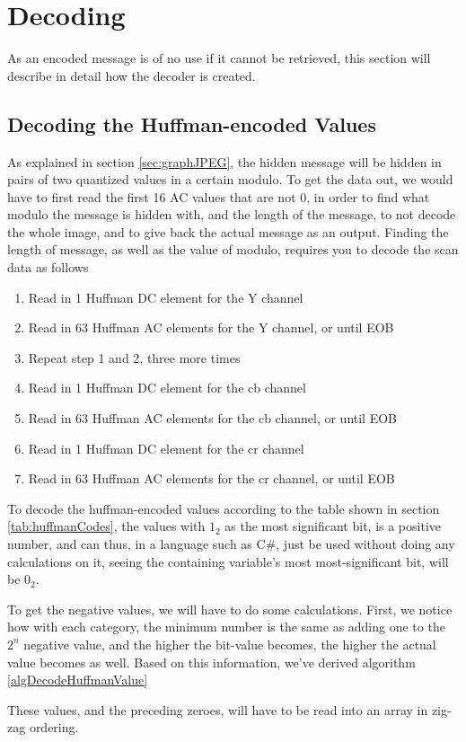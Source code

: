 \section{Decoding}
As an encoded message is of no use if it cannot be retrieved, this section will describe in detail how the decoder is created.



\subsection{Decoding the Huffman-encoded Values}
As explained in section \ref{sec:graphJPEG}, the hidden message will be hidden in pairs of two quantized values in a certain modulo.
To get the data out, we would have to first read the first 16 AC values that are not 0, in order to find what modulo the message is hidden with, and the length of the message, to not decode the whole image, and to give back the actual message as an output.
Finding the length of message, as well as the value of modulo, requires you to decode the scan data as follows
\begin{enumerate}
	\item Read in 1 Huffman DC element for the Y channel
	\item Read in 63 Huffman AC elements for the Y channel, or until EOB
	\item Repeat step 1 and 2, three more times
	\item Read in 1 Huffman DC element for the cb channel
	\item Read in 63 Huffman AC elements for the cb channel, or until EOB
	\item Read in 1 Huffman DC element for the cr channel
	\item Read in 63 Huffman AC elements for the cr channel, or until EOB
\end{enumerate}
To decode the huffman-encoded values according to the table shown in section \ref{tab:huffmanCodes}, the values with $1_2$ as the most significant bit, is a positive number, and can thus, in a language such as C\#, just be used without doing any calculations on it, seeing the containing variable's most most-significant bit, will be $0_2$.

To get the negative values, we will have to do some calculations. 
First, we notice how with each category, the minimum number is the same as adding one to the $2^n$ negative value, and the higher the bit-value becomes, the higher the actual value becomes as well. 
Based on this information, we've derived algorithm \ref{algDecodeHuffmanValue}

These values, and the preceding zeroes, will have to be read into an array in zig-zag ordering.

